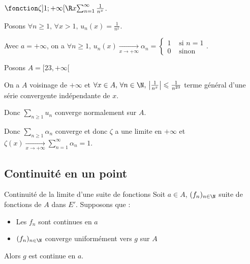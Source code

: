 \begin{exemple}
    $\fonction \zeta{]1; +\infty[}{\R}{x}{\sum_{n = 1}^{\infty} \frac 1 {n^x}}$.

    Posons $\forall n \geqslant 1, \, \forall x > 1, \, u_n(x) = \frac 1 {n^x}$.

    Avec $a = + \infty$, on a $\forall n \geqslant 1, \, u_n(x) \xrightarrow[x \to +\infty]{} \alpha_n = \left\{\begin{array}{cc} 1 & \text{ si } n = 1 \\ 0 & \text{ sinon } \end{array} \right.$.
        
    Posons $A = [23, + \infty[$

    On a $A$ voisinage de $+ \infty$ et $\forall x \in A, \, \forall n \in \N, \, \left| \frac{1}{n^x} \right| \leqslant \frac 1 {n^{23}}$ 
    terme général d'une série convergente indépendante de $x$.

    Donc $\displaystyle \sum_{n \geqslant 1} u_n$ converge normalement sur $A$. 

    Donc $\displaystyle \sum_{n \geqslant 1} \alpha_n$ converge et donc $\zeta$ a une limite en $+ \infty$ et 
    $\zeta(x) \xrightarrow[x \to +\infty]{} \sum_{n = 1 }^{\infty } \alpha_n = 1$.

\end{exemple}

\subsection{Continuité en un point }

\begin{proposition}{Continuité de la limite d'une suite de fonctions}{}
    Soit $a \in A$, $(f_n)_{n \in \N}$ suite de fonctions de $A$ dans $E'$. Supposons que : 
    \begin{itemize}
        \item Les $f_n$ sont continues en $a$
        \item $(f_n)_{n \in \N}$ converge uniformément vers $g$ sur $A$
    \end{itemize}
    Alors $g$ est continue en $a$.
\end{proposition}


